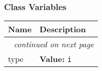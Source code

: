 
  \subsubsection{Class Variables}

    \vspace{-1cm}
\hspace{\varindent}\begin{longtable}{|p{\varnamewidth}|p{\vardescrwidth}|l}
\cline{1-2}
\cline{1-2} \centering \textbf{Name} & \centering \textbf{Description}& \\
\cline{1-2}
\endhead\cline{1-2}\multicolumn{3}{r}{\small\textit{continued on next page}}\\\endfoot\cline{1-2}
\endlastfoot\raggedright t\-y\-p\-e\- & \raggedright \textbf{Value:} 
{\tt i}&\\
\cline{1-2}
\end{longtable}

